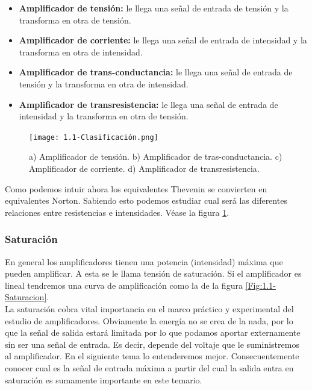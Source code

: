 \documentclass[11pt]{article} %
\begin{document}
\begin{itemize}
\item \textbf{Amplificador de tensión:} le llega una señal de entrada de tensión y la transforma en otra de tensión.
\item \textbf{Amplificador de corriente:} le llega una señal de entrada de intensidad y la transforma en otra de intensidad.
\item \textbf{Amplificador de trans-conductancia:} le llega una señal de entrada de tensión y la  transforma en otra de intensidad.
\item \textbf{Amplificador de transresistencia:} le llega una señal de entrada de intensidad y la transforma en otra de tensión.
\end{itemize}


\begin{figure}[h!] \centering
\texttt{[image: 1.1-Clasificación.png]}
\caption{a) Amplificador de tensión. b) Amplificador de tras-conductancia. c) Amplificador de corriente. d) Amplificador de transresistencia.}
\label{Fig:1.1-Clasificaion}
\end{figure}

Como podemos intuir ahora los equivalentes Thevenin se convierten en equivalentes Norton. Sabiendo esto podemos estudiar cual será las diferentes relaciones entre resistencias e intensidades. Véase la figura \ref{Fig:1.1-Clasificaion}.

\subsubsection{Saturación}

En general los amplificadores tienen una potencia (intensidad) máxima que pueden amplificar. A esta se le llama tensión de saturación. Si el amplificador es lineal tendremos una curva de amplificación como la de la figura \ref{Fig:1.1-Saturacion}. \\


La saturación cobra vital importancia en el marco práctico y experimental del estudio de amplificadores. Obviamente la energía no se crea de la nada, por lo que la señal de salida estará limitada por lo que podamos aportar externamente sin ser una señal de entrada. Es decir, depende del voltaje que le suministremos al amplificador. En el siguiente tema lo entenderemos mejor. Consecuentemente conocer cual es la señal de entrada máxima a partir del cual la salida entra en saturación es sumamente importante en este temario.
\end{document}
